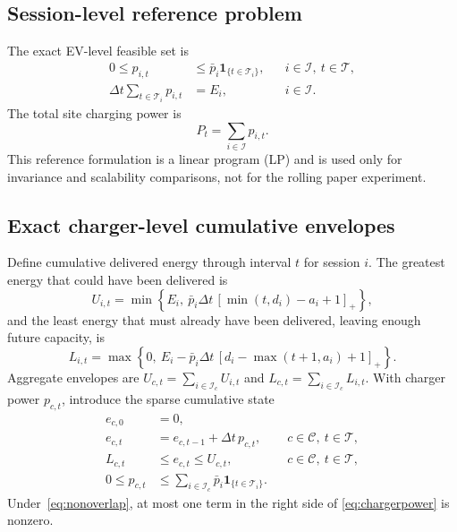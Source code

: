 \documentclass[11pt]{article}
\newcommand{\T}{\mathcal{T}}
\newcommand{\I}{\mathcal{I}}
\newcommand{\C}{\mathcal{C}}
\newcommand{\pos}[1]{\left[#1\right]_{+}}
\begin{document}
\subsection{Session-level reference problem}

The exact EV-level feasible set is
\begin{subequations}\label{eq:evfeasible}
\begin{align}
  0\le p_{i,t}&\le \bar p_i\mathbf{1}_{\{t\in\T_i\}},
    &&i\in\I,\ t\in\T, \label{eq:evpower}\\
  \Delta t\sum_{t\in\T_i}p_{i,t}&=E_i,
    &&i\in\I. \label{eq:evenergy}
\end{align}
\end{subequations}
The total site charging power is
\begin{equation}
  P_t=\sum_{i\in\I}p_{i,t}.                         \label{eq:siteload}
\end{equation}
This reference formulation is a linear program (LP) and is used only for
invariance and scalability comparisons, not for the rolling paper experiment.

\subsection{Exact charger-level cumulative envelopes}

Define cumulative delivered energy through interval \(t\) for session \(i\).
The greatest energy that could have been delivered is
\begin{equation}
  U_{i,t}=\min\!\left\{
    E_i,\ \bar p_i\Delta t\,
    \pos{\min(t,d_i)-a_i+1}
  \right\},                                        \label{eq:upper}
\end{equation}
and the least energy that must already have been delivered, leaving enough
future capacity, is
\begin{equation}
  L_{i,t}=\max\!\left\{
    0,\ E_i-\bar p_i\Delta t\,
    \pos{d_i-\max(t+1,a_i)+1}
  \right\}.                                        \label{eq:lower}
\end{equation}
Aggregate envelopes are \(U_{c,t}=\sum_{i\in\I_c}U_{i,t}\) and
\(L_{c,t}=\sum_{i\in\I_c}L_{i,t}\).  With charger power \(p_{c,t}\), introduce
the sparse cumulative state
\begin{subequations}\label{eq:charger}
\begin{align}
 e_{c,0}&=0,\\
 e_{c,t}&=e_{c,t-1}+\Delta t\,p_{c,t},
      &&c\in\C,\ t\in\T, \label{eq:state}\\
 L_{c,t}&\le e_{c,t}\le U_{c,t},
      &&c\in\C,\ t\in\T, \label{eq:envelope}\\
 0\le p_{c,t}&\le
 \sum_{i\in\I_c}\bar p_i\mathbf{1}_{\{t\in\T_i\}}.
      \label{eq:chargerpower}
\end{align}
\end{subequations}
Under~\eqref{eq:nonoverlap}, at most one term in the right side of
\eqref{eq:chargerpower} is nonzero.
\end{document}
